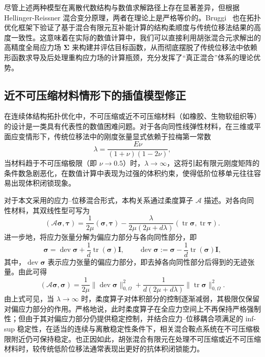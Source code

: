 尽管上述两种模型在离散代数结构与数值求解路径上存在显著差异，但根据 Hellinger-Reissner 混合变分原理，两者在理论上是严格等价的。Bruggi~\cite{bruggiTopologyOptimizationMixed2016a} 也在拓扑优化框架下验证了基于混合有限元互补能计算的结构柔顺度与传统位移法结果的高度一致性。这意味着在实际的数值计算中，我们可以直接利用胡张混合元求解出的高精度全局应力场 $\boldsymbol{\Sigma}$ 来构建并评估目标函数，从而彻底摆脱了传统位移法中依赖形函数求导及后处理重构应力场的计算瓶颈，充分发挥了“真正混合”体系的理论优势。


\subsection{近不可压缩材料情形下的插值模型修正}
\label{subsec:hz_topopt_incompressible_compliance}

在连续体结构拓扑优化中，不可压缩或近不可压缩材料（如橡胶、生物软组织等）的设计是一类具有代表性的数值困难问题。对于各向同性线弹性材料，在三维或平面应变情形下，传统位移法中的刚度张量显式依赖于拉梅第一常数
\[
\lambda=\frac{E\nu}{(1+\nu)(1-2\nu)},
\]
当材料趋于不可压缩极限（即 $\nu\to0.5$）时，$\lambda\to\infty$，这将引起有限元刚度矩阵的条件数急剧恶化，在数值计算中表现为过强的体积约束，使得低阶位移单元往往容易出现体积闭锁现象。

对于本文采用的应力{--}位移混合形式，本构关系通过柔度算子 $\mathcal A$ 描述。对各向同性材料，其双线性型可写为
\[
(\mathcal A\boldsymbol{\sigma},\boldsymbol{\tau}) =\frac{1}{2\mu}(\boldsymbol{\sigma},\boldsymbol{\tau}) -\frac{\lambda}{2\mu(2\mu+d\lambda)}(\operatorname{tr}\boldsymbol{\sigma},\operatorname{tr}\boldsymbol{\tau}).
\]
进一步地，将应力张量分解为偏应力部分与各向同性部分，即
\[
\boldsymbol{\sigma}=\operatorname{dev}\boldsymbol{\sigma}+\frac{1}{d}\operatorname{tr}(\boldsymbol{\sigma})\boldsymbol{I}, \qquad \operatorname{dev}\boldsymbol{\sigma}:=\boldsymbol{\sigma}-\frac{1}{d}\operatorname{tr}(\boldsymbol{\sigma})\boldsymbol{I},
\]
其中，$\operatorname{dev}\boldsymbol{\sigma}$ 表示应力张量的偏应力部分，即去掉各向同性部分后得到的无迹张量。由此可得
\[
(\mathcal A\boldsymbol{\sigma},\boldsymbol{\sigma}) =\frac{1}{2\mu}\|\operatorname{dev}\boldsymbol{\sigma}\|_{0,\Omega}^2 +\frac{1}{d(2\mu+d\lambda)}\|\operatorname{tr}\boldsymbol{\sigma}\|_{0,\Omega}^2.
\]
由上式可见，当 $\lambda\to\infty$ 时，柔度算子对体积部分的控制逐渐减弱，其极限仅保留对偏应力部分的作用。严格地说，此时柔度算子在全应力空间上不再保持严格强制性；但由于其对偏应力部分仍提供稳定控制，并结合应力{--}位移耦合项满足的 inf-sup 稳定性，在适当的连续与离散稳定性条件下，相关混合鞍点系统在不可压缩极限附近仍可保持稳定。也正因如此，胡张混合有限元在处理不可压缩或近不可压缩材料时，较传统低阶位移法通常表现出更好的抗体积闭锁能力。

